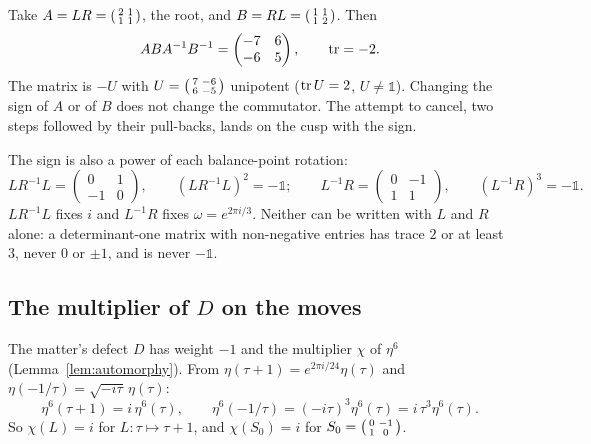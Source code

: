 Take $A=LR=\begin{psmallmatrix}2&1\\1&1\end{psmallmatrix}$, the root, and
$B=RL=\begin{psmallmatrix}1&1\\1&2\end{psmallmatrix}$. Then
\[
  ABA^{-1}B^{-1}=\begin{pmatrix}-7&6\\-6&5\end{pmatrix},\qquad \operatorname{tr}=-2 .
\]
The matrix is $-U$ with $U=\begin{psmallmatrix}7&-6\\6&-5\end{psmallmatrix}$ unipotent ($\operatorname{tr} U=2$, $U\neq\mathbb 1$). Changing
the sign of $A$ or of $B$ does not change the commutator. The attempt to cancel, two steps followed by their
pull-backs, lands on the cusp with the sign.

The sign is also a power of each balance-point rotation:
\[
  LR^{-1}L=\begin{pmatrix}0&1\\-1&0\end{pmatrix},\qquad (LR^{-1}L)^2=-\mathbb 1;\qquad
  L^{-1}R=\begin{pmatrix}0&-1\\1&1\end{pmatrix},\qquad (L^{-1}R)^3=-\mathbb 1 .
\]
$LR^{-1}L$ fixes $i$ and $L^{-1}R$ fixes $\omega=e^{2\pi i/3}$. Neither can be written with $L$ and $R$ alone: a
determinant-one matrix with non-negative entries has trace $2$ or at least $3$, never $0$ or $\pm1$, and is never
$-\mathbb 1$.

\subsection{The multiplier of $D$ on the moves}

The matter's defect $D$ has weight $-1$ and the multiplier $\chi$ of $\eta^6$ (Lemma~\ref{lem:automorphy}). From
$\eta(\tau+1)=e^{2\pi i/24}\eta(\tau)$ and $\eta(-1/\tau)=\sqrt{-i\tau}\,\eta(\tau)$:
\[
  \eta^6(\tau+1)=i\,\eta^6(\tau),\qquad \eta^6(-1/\tau)=(-i\tau)^3\eta^6(\tau)=i\,\tau^3\eta^6(\tau).
\]
So $\chi(L)=i$ for $L:\tau\mapsto\tau+1$, and $\chi(S_0)=i$ for $S_0=\begin{psmallmatrix}0&-1\\1&0\end{psmallmatrix}$.

